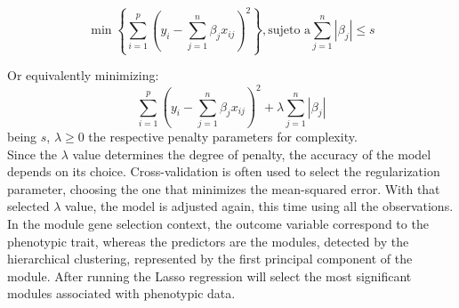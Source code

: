 \documentclass[journal, onecolumn]{IEEEtran}
\newcommand{\abs}[1]{\left\vert#1\right\vert}
\begin{document}
\begin{equation}
\min \left\lbrace\sum_{i=1}^{p}{\left( y_i-\sum_{j=1}^n{\beta_j x_{ij}}\right)^2} \right\rbrace , \textrm{sujeto a} \sum_{j=1}^n\abs{\beta_j}\leq s
\end{equation}

Or equivalently minimizing:
\begin{equation}
\sum_{i=1}^{p}{\left( y_i-\sum_{j=1}^n{\beta_j x_{ij}}\right)^2} + \lambda \sum_{j=1}^n\abs{\beta_j}
\end{equation}
being $ s $, $ \lambda \geq 0 $ the respective penalty parameters for complexity.\\



Since the $\lambda$ value determines the degree of penalty, the accuracy of the model depends on its choice. Cross-validation is often used to select the regularization parameter, choosing the one that minimizes the mean-squared error. With that selected $\lambda$ value, the model is adjusted again, this time using all the observations.\\

In the module gene selection context, the outcome variable correspond to the phenotypic trait, whereas the predictors are the modules, detected by the hierarchical clustering, represented by the first principal component of the module. After running the Lasso regression will select the most significant modules associated with phenotypic data.  
\end{document}

